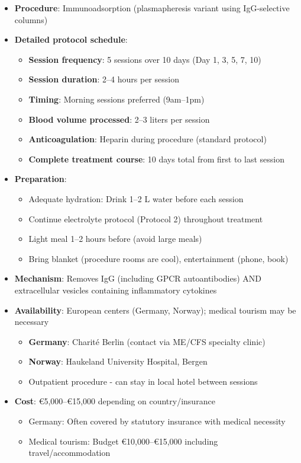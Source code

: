 \begin{itemize}
    \item \textbf{Procedure}: Immunoadsorption (plasmapheresis variant using IgG-selective columns)

    \item \textbf{Detailed protocol schedule}:
    \begin{itemize}
        \item \textbf{Session frequency}: 5 sessions over 10 days (Day 1, 3, 5, 7, 10)
        \item \textbf{Session duration}: 2--4 hours per session
        \item \textbf{Timing}: Morning sessions preferred (9am--1pm)
        \item \textbf{Blood volume processed}: 2--3 liters per session
        \item \textbf{Anticoagulation}: Heparin during procedure (standard protocol)
        \item \textbf{Complete treatment course}: 10 days total from first to last session
    \end{itemize}

    \item \textbf{Preparation}:
    \begin{itemize}
        \item Adequate hydration: Drink 1--2 L water before each session
        \item Continue electrolyte protocol (Protocol 2) throughout treatment
        \item Light meal 1--2 hours before (avoid large meals)
        \item Bring blanket (procedure rooms are cool), entertainment (phone, book)
    \end{itemize}

    \item \textbf{Mechanism}: Removes IgG (including GPCR autoantibodies) AND extracellular vesicles containing inflammatory cytokines

    \item \textbf{Availability}: European centers (Germany, Norway); medical tourism may be necessary
    \begin{itemize}
        \item \textbf{Germany}: Charité Berlin (contact via ME/CFS specialty clinic)
        \item \textbf{Norway}: Haukeland University Hospital, Bergen
        \item Outpatient procedure - can stay in local hotel between sessions
    \end{itemize}

    \item \textbf{Cost}: \euro{5,000}--\euro{15,000} depending on country/insurance
    \begin{itemize}
        \item Germany: Often covered by statutory insurance with medical necessity
        \item Medical tourism: Budget \euro{10,000}--\euro{15,000} including travel/accommodation
    \end{itemize}
\end{itemize}

